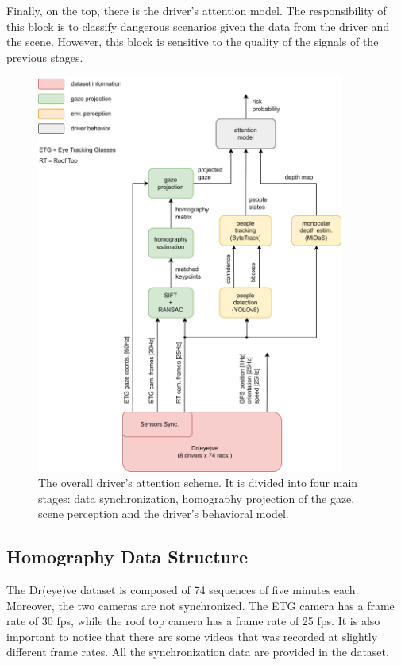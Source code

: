 Finally, on the top, there is the driver's attention model. The responsibility 
of this block is to classify dangerous scenarios given the data from the 
driver and the scene. However, this block is sensitive to the quality of the 
signals of the previous stages.

\begin{figure}
    \centering
    \includegraphics[width=0.9\textwidth]{images/dreyeve/classic_scheme.png}
    \vspace*{0.6cm}
    \caption{The overall driver's attention scheme. It is divided into four main 
    stages: data synchronization, homography projection of the gaze, scene 
    perception and the driver's behavioral model.
    }
    \label{fig:driver_attention}
\end{figure}

\subsection{Homography Data Structure}
The Dr(eye)ve dataset is composed of 74 sequences of five minutes each. 
Moreover, the two cameras are not synchronized. 
The ETG camera has a frame rate of 30 fps, while the roof top camera has a 
frame rate of 25 fps. It is also important to notice that there are some videos 
that was recorded at slightly different frame rates. All the synchronization data 
are provided in the dataset.


